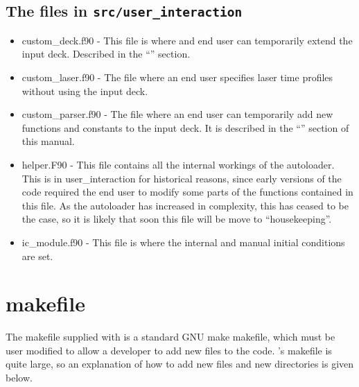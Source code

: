 \documentclass[12pt,a4paper]{article}
\newcommand{\inlinecode}[1]{{\color{warwickred} \bf\texttt{#1}}}
\newcommand{\EPOCH}{{\color{warwickdark}\fontfamily{phv}\selectfont{EPOCH}}}
\begin{document}
\subsection{The files in \inlinecode{src/user\_interaction}}
\begin{itemize}
\item custom\_deck.f90 - This file is where and end user can temporarily
  extend the input deck. Described in the ``''
  section.
\item custom\_laser.f90 - The file where an end user specifies laser time
  profiles without using the input deck.
\item custom\_parser.f90 - The file where an end user can temporarily add new
  functions and constants to the input deck. It is described in the
  ``'' section of this manual.
\item helper.F90 - This file contains all the internal workings of the
  autoloader. This is in user\_interaction for historical reasons, since early
  versions of the code required the end user to modify some parts of the
  functions contained in this file. As the autoloader has increased in
  complexity, this has ceased to be the case, so it is likely that soon this
  file will be move to ``housekeeping''.
\item ic\_module.f90 - This file is where the internal and manual initial
  conditions are set.
\end{itemize}

\section{{\EPOCH} makefile}

The makefile supplied with {\EPOCH} is a standard GNU make makefile, which must
be user modified to allow a developer to add new files to the code. {\EPOCH}'s
makefile is quite large, so an explanation of how to add new files and new
directories is given below.
\end{document}

